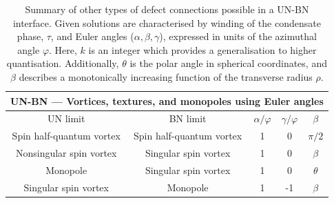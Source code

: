 \begin{table}
    \centering
    \begin{tabular}{ccccc}
        \toprule
        \multicolumn{5}{c}{UN-BN --- Vortices, textures, and monopoles using
        Euler angles} \\
        \midrule
        UN limit & BN limit &  \(\alpha/\varphi \) & \(\gamma/\varphi \)
            & \(\beta \) \\
        \midrule
        Spin half-quantum vortex & Spin half-quantum vortex & 1 & 0
            & \(\pi/2\) \\
        Nonsingular spin vortex & Singular spin vortex & 1 & 0
            & \(\beta\) \\
        Monopole & Singular spin vortex & 1  & 0 & \(\theta \) \\
        Singular spin vortex & Monopole & 1 & -1 & \(\beta\) \\ 
        \bottomrule
    \end{tabular}
    \caption[Examples of monopole and nonsingular vortex connections across a
    uniaxial nematic to biaxial nematic interface]
    {\label{tab: UN-BN-nonsingular}
    Summary of other types of defect connections possible in a UN-BN interface.
    Given solutions are characterised by winding of the condensate phase,
    \(\tau \), and Euler angles (\(\alpha, \beta, \gamma \)), expressed in units
    of the azimuthal angle \(\varphi \).
    Here, \(k\) is an integer which provides a generalisation to higher
    quantisation.
    Additionally, \(\theta \) is the polar angle in spherical coordinates, and
    \(\beta\) describes a monotonically increasing function of the
    transverse radius \(\rho \).}
\end{table}

